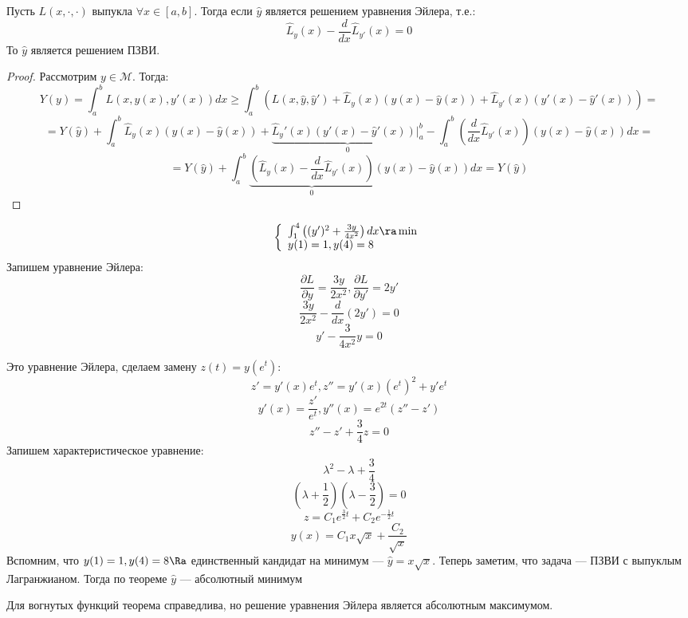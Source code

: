 \begin{theorem}
    Пусть \(L(x, \cdot, \cdot)\) выпукла \(\forall x \in [a, b]\). Тогда если \(\widehat{y}\) является решением уравнения Эйлера, т.е.:
    \[\widehat{L}_{y}(x) - \frac{d}{dx}\widehat{L}_{y'}(x) = 0\]
    То \(\widehat{y}\) является решением ПЗВИ.
\end{theorem}
\begin{proof}
    Рассмотрим \(y \in \mathcal{M}\). Тогда:
    \[Y(y) = \int_a^b L(x, y(x), y'(x))dx \ge \int_a^b \left( L(x, \widehat{y}, \widehat{y}') + \widehat{L}_{y}(x)(y(x) - \widehat{y}(x)) + \widehat{L}_{y'}(x)(y'(x) - \widehat{y}'(x)) \right) =\]
    \[= Y(\widehat{y}) + \int_a^b \widehat{L}_y(x)(y(x) - \widehat{y}(x)) + \underbrace{\widehat{L}_y'(x)(y'(x) - \widehat{y}'(x))\big|_a^b}_0 - \int_a^b \left( \frac{d}{dx}\widehat{L}_{y'}(x) \right)(y(x) - \widehat{y}(x))dx = \]
    \[= Y(\widehat{y}) + \int_a^b \underbrace{\left( \widehat{L}_{y}(x) - \frac{d}{dx}\widehat{L}_{y'}(x) \right)}_0(y(x) - \widehat{y}(x))dx = Y(\widehat{y})\]
\end{proof}

\begin{example}
    \[\left\{\begin{array}{l}
        \int_1^4 \left( (y')^2 + \frac{3y}{4x^2} \right)dx \ra \min \\
        y(1) = 1, y(4) = 8
    \end{array}\right.\]
    Запишем уравнение Эйлера:
    \[\frac{\partial L}{\partial y} = \frac{3y}{2x^2}, \frac{\partial L}{\partial y'} = 2y'\]
    \[\frac{3y}{2x^2} - \frac{d}{dx}(2y') = 0\]
    \[y' - \frac{3}{4x^2}y = 0\]
    
    Это уравнение Эйлера, сделаем замену \(z(t) = y(e^t)\):
    \[z' = y'(x)e^t, z'' = y'(x)(e^t)^2 + y'e^t\]
    \[y'(x) = \frac{z'}{e^t}, y''(x) = e^{2t}(z'' - z')\]
    \[z'' - z' + \frac{3}{4}z = 0\]
    Запишем характеристическое уравнение:
    \[\lambda^2 - \lambda + \frac{3}{4}\]
    \[\left( \lambda + \frac{1}{2} \right)\left( \lambda - \frac{3}{2} \right) = 0\]
    \[z = C_1e^{\frac{3}{2}t} + C_2e^{-\frac{1}{2}t}\]
    \[y(x) = C_1x\sqrt{x} + \frac{C_2}{\sqrt{x}}\]
    Вспомним, что \(y(1) = 1, y(4) = 8 \Ra\) единственный кандидат на минимум --- \(\widehat{y} = x\sqrt{x}\). Теперь заметим, что задача --- ПЗВИ с выпуклым Лагранжианом. Тогда по теореме \(\widehat{y}\) --- абсолютный минимум
\end{example}

\begin{note}
    Для вогнутых функций теорема справедлива, но решение уравнения Эйлера является абсолютным максимумом.
\end{note}
